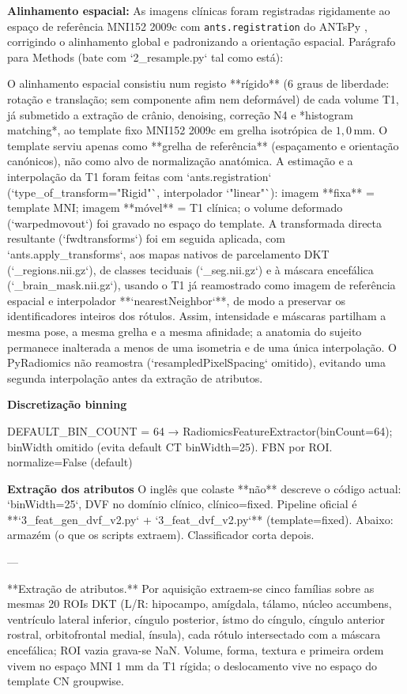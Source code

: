 \documentclass[review]{elsarticle}
\newcommand{\code}[1]{\texttt{#1}}
\begin{document}
	\textbf{Alinhamento espacial:} As imagens clínicas foram registradas rigidamente ao espaço de referência MNI152 2009c \cite{fonov-2009,fonov-2011} com \code{ants.registration} do ANTsPy \cite{avants-2011a,tustison-2021}, corrigindo o alinhamento global e padronizando a orientação espacial.
	Parágrafo para Methods (bate com `2\_resample.py` tal como está):
	
	O alinhamento espacial consistiu num registo **rígido** (6 graus de liberdade: rotação e translação; sem componente afim nem deformável) de cada volume T1, já submetido a extração de crânio, denoising, correção N4 e *histogram matching*, ao template fixo MNI152 2009c em grelha isotrópica de \(1{,}0\)\,mm. O template serviu apenas como **grelha de referência** (espaçamento e orientação canónicos), não como alvo de normalização anatómica. A estimação e a interpolação da T1 foram feitas com `ants.registration` (`type\_of\_transform="Rigid"`, interpolador `"linear"`): imagem **fixa** = template MNI; imagem **móvel** = T1 clínica; o volume deformado (`warpedmovout`) foi gravado no espaço do template. A transformada directa resultante (`fwdtransforms`) foi em seguida aplicada, com `ants.apply\_transforms`, aos mapas nativos de parcelamento DKT (`\_regions.nii.gz`), de classes teciduais (`\_seg.nii.gz`) e à máscara encefálica (`\_brain\_mask.nii.gz`), usando o T1 já reamostrado como imagem de referência espacial e interpolador **`nearestNeighbor`**, de modo a preservar os identificadores inteiros dos rótulos. Assim, intensidade e máscaras partilham a mesma pose, a mesma grelha e a mesma afinidade; a anatomia do sujeito permanece inalterada a menos de uma isometria e de uma única interpolação. O PyRadiomics não reamostra (`resampledPixelSpacing` omitido), evitando uma segunda interpolação antes da extração de atributos.
	
	\textbf{Discretização binning}
	
	DEFAULT\_BIN\_COUNT = 64 → RadiomicsFeatureExtractor(binCount=64); binWidth omitido (evita default CT binWidth=25). FBN por ROI. normalize=False (default)
	
	\textbf{Extração dos atributos}
	O inglês que colaste **não** descreve o código actual: `binWidth=25`, DVF no domínio clínico, clínico=fixed. Pipeline oficial é **`3\_feat\_gen\_dvf\_v2.py` + `3\_feat\_dvf\_v2.py`** (template=fixed). Abaixo: armazém (o que os scripts extraem). Classificador corta depois.
	
	---
	
	**Extração de atributos.** Por aquisição extraem-se cinco famílias sobre as mesmas 20 ROIs DKT (L/R: hipocampo, amígdala, tálamo, núcleo accumbens, ventrículo lateral inferior, cíngulo posterior, ístmo do cíngulo, cíngulo anterior rostral, orbitofrontal medial, ínsula), cada rótulo intersectado com a máscara encefálica; ROI vazia grava-se NaN. Volume, forma, textura e primeira ordem vivem no espaço MNI 1 mm da T1 rígida; o deslocamento vive no espaço do template CN groupwise.
	
\end{document}
